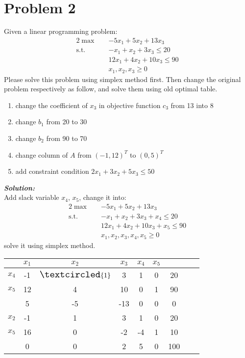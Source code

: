 \documentclass[paper=a4, fontsize=11pt]{scrartcl} %
\numberwithin{equation}{section} %
\numberwithin{figure}{section} %
\numberwithin{table}{section} %
\begin{document}
\section{Problem 2}
Given a linear programming problem:
\begin{alignat}{2}          \nonumber
\max\quad & -5x_1+5x_2+13x_3 \\    \nonumber
\mbox{s.t.}\quad            \nonumber
& -x_1+x_2+3x_3 \leq 20\\        \nonumber
& 12x_1+4x_2+10x_3 \leq 90\\         \nonumber
& x_1,x_2,x_3 \geq 0
\end{alignat}
Please solve this problem using simplex method first. Then change the original problem respectively as follow, and solve them using old optimal table.
\begin{enumerate}
\item change the coefficient of $x_3$ in objective function $c_3$ from 13 into 8
\item change $b_1$ from 20 to 30
\item change $b_2$ from 90 to 70
\item change column of $A$ from $(-1, 12)^T$ to $(0, 5)^T$
\item add constraint condition $2x_1+3x_2+5x_3\leq50$
\end{enumerate}
\emph{\textbf{Solution:}}\\
Add slack variable $x_4$, $x_5$, change it into:
\begin{alignat}{2}          \nonumber
\max\quad & -5x_1+5x_2+13x_3 \\    \nonumber
\mbox{s.t.}\quad            \nonumber
& -x_1+x_2+3x_3 +x_4\leq 20\\        \nonumber
& 12x_1+4x_2+10x_3+x_5 \leq 90\\         \nonumber
& x_1,x_2,x_3,x_4,x_5 \geq 0
\end{alignat}
solve it using simplex method.\\
\begin{tabular}{|c|c|c|c|c|c|c|c|c|}
\hline &$x_1$&$x_2$&$x_3$&$x_4$&$x_5$&\\
\hline$x_4$&-1&$\Large{\textcircled{\small{1}}}$&3&1&0&20\\
$x_5$&12&4&10&0&1&90\\
\hline &5&-5&-13&0&0&0\\
\hline
\hline$x_2$&-1&1&3&1&0&20\\
$x_5$&16&0&-2&-4&1&10\\
\hline &0&0&2&5&0&100\\
\hline
\end{tabular}\\
\end{document}
